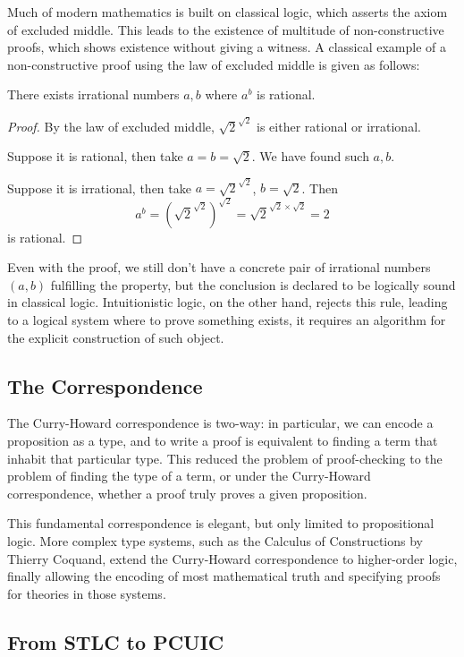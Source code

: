 Much of modern mathematics is built on classical logic, which asserts the axiom
of excluded middle. This leads to the existence of multitude of non-constructive 
proofs, which shows existence without giving a witness. A classical example of a
non-constructive proof using the law of excluded middle is given as follows:

\begin{theorem}
There exists irrational numbers $a, b$ where $a^b$ is rational.
\end{theorem}
\begin{proof}
By the law of excluded middle, $\sqrt{2}^{\sqrt{2}}$ is either rational or
irrational. 
    
Suppose it is rational, then take $a=b=\sqrt{2}$. We have found such $a,b$.

Suppose it is irrational, then take $a=\sqrt{2}^{\sqrt{2}}$, $b=\sqrt{2}$. Then
\[a^b={\left(\sqrt{2}^{\sqrt{2}}\right)}^{\sqrt{2}}=\sqrt{2}^{\sqrt{2}\times\sqrt{2}}=2\]
is rational.
\end{proof}

Even with the proof, we still don't have a concrete pair of irrational numbers
$(a,b)$ fulfilling the property, but the conclusion is declared to be logically
sound in classical logic. Intuitionistic logic, on the other hand, rejects this
rule, leading to a logical system where to prove something exists, it requires
an algorithm for the explicit construction of such object.

\subsection{The Correspondence}
The Curry-Howard correspondence is two-way: in particular, we can encode
a proposition as a type, and to write a proof is equivalent to 
finding a term that inhabit that particular type. This reduced the
problem of proof-checking to the problem of finding the type of a term,
or under the Curry-Howard correspondence, whether a proof truly proves
a given proposition.

This fundamental correspondence is elegant, but only limited to 
propositional logic. More complex type systems, such as the
Calculus of Constructions by Thierry Coquand, extend the Curry-Howard
correspondence to higher-order logic, finally allowing the encoding of
most mathematical truth and specifying proofs for theories in those 
systems.

\subsection{From STLC to PCUIC}

